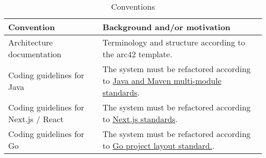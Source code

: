 \begin{table}[h!tbp]
    \centering
    \begin{tabularx}{1\textwidth} {
        | >{\raggedright\arraybackslash}X
        | >{\raggedleft\arraybackslash}X | }
        \hline
        Convention & Background and/or motivation \\
        \hline
        Architecture documentation & Terminology and structure according to the arc42 template. \\
        \hline
        Coding guidelines for Java & The system must be refactored according to \href{https://vaadin.com/docs/latest/building-apps/project-structure/multi-module}{Java and Maven multi-module standards}. \\
        \hline
        Coding guidelines for Next.js / React & The system must be refactored according to \href{https://github.com/dwarvesf/nextjs-boilerplate/blob/master/docs/CODE_STYLE.md}{Next.js standards}. \\
        \hline
        Coding guidelines for Go & The system must be refactored according to \href{https://github.com/golang-standards/project-layout}{Go project layout standard.}. \\
        \hline
    \end{tabularx}
    \caption{Conventions}
    \label{tab:conventions}
\end{table}